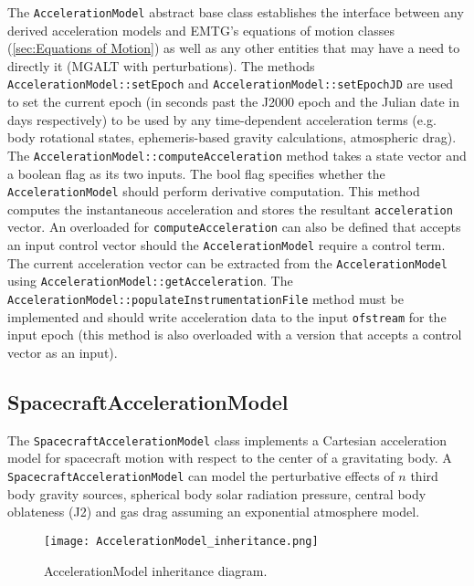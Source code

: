 The \texttt{AccelerationModel} abstract base class establishes the interface between any derived acceleration models and EMTG's equations of motion classes (\ref{sec:Equations of Motion}) as well as any other entities that may have a need to directly it (MGALT with perturbations). The methods \texttt{AccelerationModel::setEpoch} and \texttt{AccelerationModel::setEpochJD} are used to set the current epoch (in seconds past the J2000 epoch and the Julian date in days respectively) to be used by any time-dependent acceleration terms (e.g. body rotational states, ephemeris-based gravity calculations, atmospheric drag). The \texttt{AccelerationModel::computeAcceleration} method takes a state vector and a boolean flag as its two inputs. The bool flag specifies whether the \texttt{AccelerationModel} should perform derivative computation. This method computes the instantaneous acceleration and stores the resultant \texttt{acceleration} vector. An overloaded for \texttt{computeAcceleration} can also be defined that accepts an input control vector should the \texttt{AccelerationModel} require a control term. The current acceleration vector can be extracted from the \texttt{AccelerationModel} using \texttt{AccelerationModel::getAcceleration}. The \texttt{AccelerationModel::populateInstrumentationFile} method must be implemented and should write acceleration data to the input \texttt{ofstream} for the input epoch (this method is also overloaded with a version that accepts a control vector as an input). 

\subsection{SpacecraftAccelerationModel}
\label{sec:spacecraft_acceleration_model}

The \texttt{SpacecraftAccelerationModel} class implements a Cartesian acceleration model for spacecraft motion with respect to the center of a gravitating body. A \texttt{SpacecraftAccelerationModel} can model the perturbative effects of $n$ third body gravity sources, spherical body solar radiation pressure, central body oblateness (J2) and gas drag assuming an exponential atmosphere model.

\begin{figure}[h!]
    \centering
    \texttt{[image: AccelerationModel\_inheritance.png]}
    \caption{\label{fig:AccelerationModel_inheritance} AccelerationModel inheritance diagram.}
\end{figure} 

